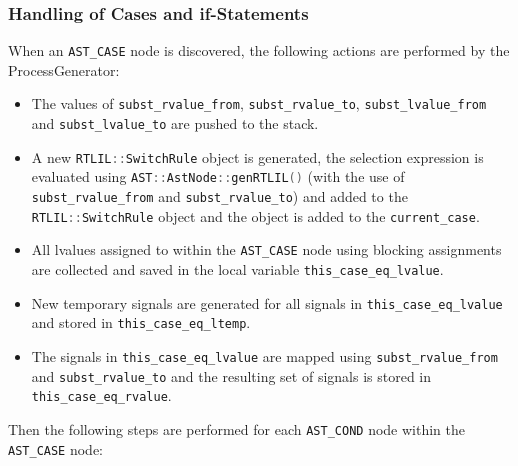 \subsubsection{Handling of Cases and if-Statements}

\begin{sloppypar}
When an {\tt AST\_CASE} node is discovered, the following actions are performed by
the ProcessGenerator:

\begin{itemize}
\item The values of \lstinline[language=C++]{subst_rvalue_from}, \lstinline[language=C++]{subst_rvalue_to},
\lstinline[language=C++]{subst_lvalue_from} and \lstinline[language=C++]{subst_lvalue_to} are pushed to the stack.
%
\item A new \lstinline[language=C++]{RTLIL::SwitchRule} object is generated, the selection expression is evaluated using
\lstinline[language=C++]{AST::AstNode::genRTLIL()} (with the use of \lstinline[language=C++]{subst_rvalue_from} and
\lstinline[language=C++]{subst_rvalue_to}) and added to the \lstinline[language=C++]{RTLIL::SwitchRule} object and the
object is added to the \lstinline[language=C++]{current_case}.
%
\item All lvalues assigned to within the {\tt AST\_CASE} node using blocking assignments are collected and
saved in the local variable \lstinline[language=C++]{this_case_eq_lvalue}.
%
\item New temporary signals are generated for all signals in \lstinline[language=C++]{this_case_eq_lvalue} and stored
in \lstinline[language=C++]{this_case_eq_ltemp}.
%
\item The signals in \lstinline[language=C++]{this_case_eq_lvalue} are mapped using \lstinline[language=C++]{subst_rvalue_from}
and \lstinline[language=C++]{subst_rvalue_to} and the resulting set of signals is stored in
\lstinline[language=C++]{this_case_eq_rvalue}.
\end{itemize}

Then the following steps are performed for each {\tt AST\_COND} node within the {\tt AST\_CASE} node:


\end{sloppypar}
